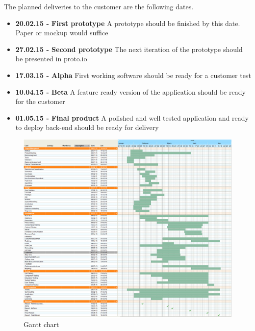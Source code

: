 The planned deliveries to the customer are the following dates. 
\begin{itemize}
\item \textbf{20.02.15 - First prototype} \newline
A prototype should be finished by this date. Paper or mockup would suffice  
\item \textbf{27.02.15 - Second prototype}  \newline
The next iteration of the prototype should be presented in proto.io \cite{protoIO}
\item \textbf{17.03.15 - Alpha} \newline
First working software should be ready for a customer test
\item \textbf{10.04.15 - Beta}  \newline
A feature ready version of the application should be ready for the customer 
\item \textbf{01.05.15 - Final product} \newline
A polished and well tested application and ready to deploy back-end should be ready for delivery 
\end{itemize}


\begin{figure}[h!]
	\begin{center}
		\advance\leftskip-3cm
		\advance\rightskip-3cm
		\includegraphics[keepaspectratio=true,scale=0.5]{fig/gantt}
		\caption{Gantt chart}
		\label{Fig:gantt}
	\end{center}
\end{figure}


